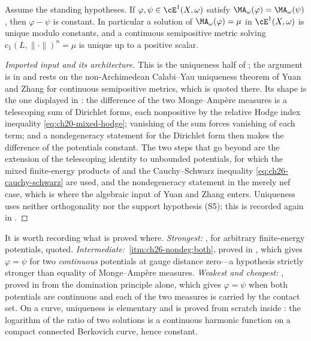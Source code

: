 \begin{theorem}
\label{thm:ch29-uniqueness}
Assume the standing hypotheses.  If
\(\varphi,\psi\in\cE^1(X,\omega)\) satisfy
\(\MA_\omega(\varphi)=\MA_\omega(\psi)\), then \(\varphi-\psi\) is
constant.  In particular a solution of \(\MA_\omega(\varphi)=\mu\) in
\(\cE^1(X,\omega)\) is unique modulo constants, and a continuous
semipositive metric solving \(c_1(L,\lVert\cdot\rVert)^n=\mu\) is unique up
to a positive scalar.
\end{theorem}

\begin{proof}[Imported input and its architecture]
This is the uniqueness half of \cite[Theorem~A]{BFJ15}; the argument is in
\cite[\S8]{BFJ15} and rests on the non-Archimedean Calabi--Yau uniqueness
theorem of Yuan and Zhang for continuous semipositive metrics, which is
quoted there.  Its shape is the one displayed in
: the difference of the two
Monge--Amp\`ere measures is a telescoping sum of Dirichlet forms, each
nonpositive by the relative Hodge index inequality
\eqref{eq:ch20-mixed-hodge}; vanishing of the sum forces vanishing of each
term; and a nondegeneracy statement for the Dirichlet form then makes the
difference of the potentials constant.  The two steps that go beyond
 are the extension of the telescoping
identity to unbounded potentials, for which the mixed finite-energy
products of  and the Cauchy--Schwarz inequality
\eqref{eq:ch26-cauchy-schwarz} are used, and the nondegeneracy statement in
the merely nef case, which is where the algebraic input of Yuan and Zhang
enters.  Uniqueness uses neither orthogonality nor the support hypothesis
\textup{(S5)}; this is recorded again in
.
\end{proof}

\begin{remark}
\label{rem:ch29-uniqueness-ladder}
It is worth recording what is proved where.  \emph{Strongest:}
, for arbitrary finite-energy potentials, quoted.
\emph{Intermediate:} \,\cref{itm:ch26-nondeg:both},
proved in , which gives \(\varphi=\psi\) for two
\emph{continuous} potentials at gauge distance zero---a hypothesis strictly
stronger than equality of Monge--Amp\`ere measures.  \emph{Weakest and
cheapest:} , proved in
 from the domination principle alone, which gives
\(\varphi=\psi\) when both potentials are continuous and each of the two
measures is carried by the contact set.  On a curve, uniqueness is
elementary and is proved from scratch inside
: the logarithm of the ratio of
two solutions is a continuous harmonic function on a compact connected
Berkovich curve, hence constant.
\end{remark}

